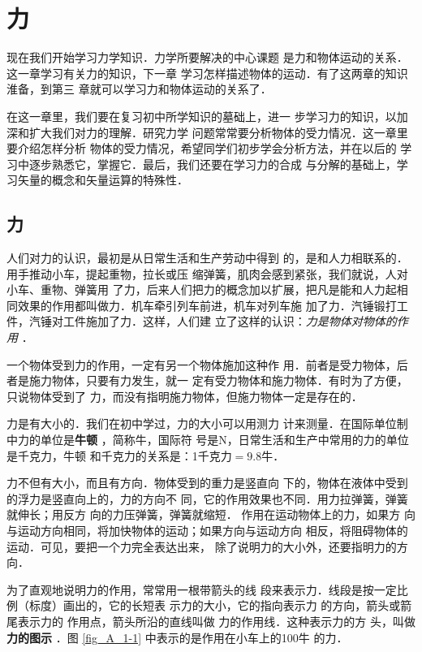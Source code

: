 \chapter{力} 

    现在我们开始学习力学知识．力学所要解决的中心课题
是力和物体运动的关系．这一章学习有关力的知识，下一章
学习怎样描述物体的运动．有了这两章的知识淮备，到第三
章就可以学习力和物体运动的关系了．

    在这一章里，我们要在复习初中所学知识的墓础上，进一
步学习力的知识，以加深和扩大我们对力的理解．研究力学
问题常常要分析物体的受力情况．这一章里要介绍怎样分析
物体的受力情况，希望同学们初步学会分析方法，并在以后的
学习中逐步熟悉它，掌握它．最后，我们还要在学习力的合成
与分解的基础上，学习矢量的概念和矢量运算的特殊性．


\section{力} 
    人们对力的认识，最初是从日常生活和生产劳动中得到
的，是和人力相联系的．用手推动小车，提起重物，拉长或压
缩弹簧，肌肉会感到紧张，我们就说，人对小车、重物、弹簧用
了力，后来人们把力的概念加以扩展，把凡是能和人力起相
同效果的作用都叫做力．机车牵引列车前进，机车对列车施
加了力．汽锤锻打工件，汽锤对工件施加了力．这样，人们建
立了这样的认识：\textit{力是物体对物体的作用} ．

一个物体受到力的作用，一定有另一个物体施加这种作
用．前者是受力物体，后者是施力物体，只要有力发生，就一
定有受力物体和施力物体．有时为了方便，只说物体受到了
力，而没有指明施力物体，但施力物体一定是存在的．

    力是有大小的．我们在初中学过，力的大小可以用测力
计来测量．在国际单位制中力的单位是\textbf{牛顿} ，简称牛，国际符
号是N，日常生活和生产中常用的力的单位是千克力，牛顿
和千克力的关系是：1千克力$=9.8$牛．

    力不但有大小，而且有方向．物体受到的重力是竖直向
下的，物体在液体中受到的浮力是竖直向上的，力的方向不
同，它的作用效果也不同．用力拉弹簧，弹簧就伸长；用反方
向的力压弹簧，弹簧就缩短．
作用在运动物体上的力，如果方
向与运动方向相同，将加快物体的运动；如果方向与运动方向
相反，将阻碍物体的运动．可见，要把一个力完全表达出来，
除了说明力的大小外，还要指明力的方向．

为了直观地说明力的作用，常常用一根带箭头的线
段来表示力．线段是按一定比
例（标度）画出的，它的长短表
示力的大小，它的指向表示力
的方向，箭头或箭尾表示力的
作用点，箭头所沿的直线叫做
力的作用线．这种表示力的方
头，叫做\textbf{力的图示} ．图  \ref{fig_A_1-1}  中表示的是作用在小车上的100牛
的力．

